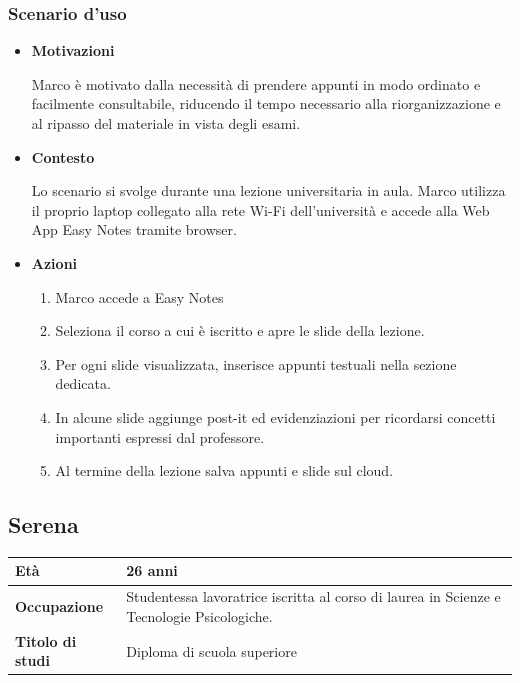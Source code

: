 \subsubsection{Scenario d'uso}
\begin{itemize}
    \item \textbf{Motivazioni}\par
    Marco è motivato dalla necessità di prendere appunti in modo ordinato e facilmente consultabile, riducendo il tempo necessario alla riorganizzazione e al ripasso del materiale in vista degli esami.
    \item \textbf{Contesto}\par
    Lo scenario si svolge durante una lezione universitaria in aula. Marco utilizza il proprio laptop collegato alla rete Wi-Fi dell'università e accede alla Web App Easy Notes tramite browser.
    \item \textbf{Azioni}\par
    \begin{enumerate}
        \item Marco accede a Easy Notes
        \item Seleziona il corso a cui è iscritto e apre le slide della lezione.
        \item Per ogni slide visualizzata, inserisce appunti testuali nella sezione dedicata.
        \item In alcune slide aggiunge post-it ed evidenziazioni per ricordarsi concetti importanti espressi dal professore.
        \item Al termine della lezione salva appunti e slide sul cloud.
    \end{enumerate}
\end{itemize}

\subsection{Serena}
\begin{table}[h]
\centering
\begin{tabular}{|l|p{10cm}|}
\hline
\textbf{Età} & 26 anni \\
\hline
\textbf{Occupazione} & Studentessa lavoratrice iscritta al corso di laurea in Scienze e Tecnologie Psicologiche. \\
\hline
\textbf{Titolo di studi} & Diploma di scuola superiore \\
\hline
\end{tabular}
\end{table}

